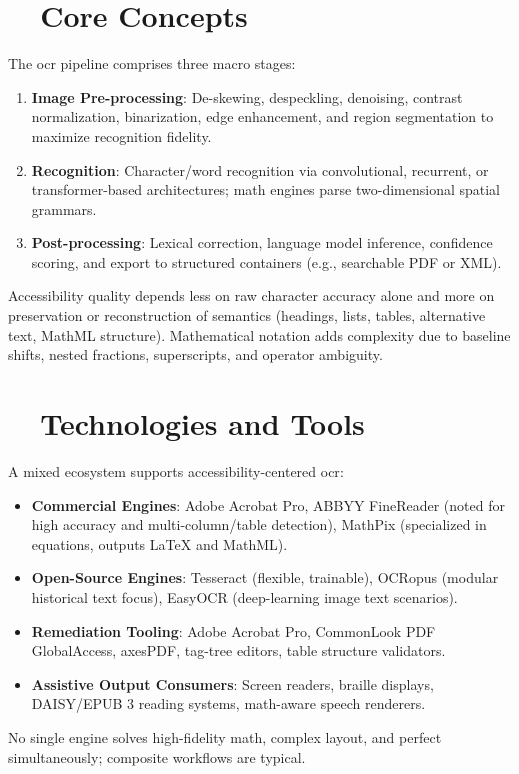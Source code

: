 \section{~~Core Concepts}
\label{sec:ocr-core-concepts}
The \gls{ocr} pipeline comprises three macro stages:
\begin{enumerate}
	\item \textbf{Image Pre-processing}: De-skewing, despeckling, denoising, contrast normalization, binarization, edge enhancement, and region segmentation to maximize recognition fidelity.
	\item \textbf{Recognition}: Character/word recognition via convolutional, recurrent, or transformer-based architectures; math engines parse two-dimensional spatial grammars.
	\item \textbf{Post-processing}: Lexical correction, language model inference, confidence scoring, and export to structured containers (e.g., searchable PDF or XML).
\end{enumerate}
Accessibility quality depends less on raw character accuracy alone and more on preservation or reconstruction of semantics (headings, lists, tables, alternative text, MathML structure). Mathematical notation adds complexity due to baseline shifts, nested fractions, superscripts, and operator ambiguity.

\section{~~Technologies and Tools}
\label{sec:ocr-tools}
A mixed ecosystem supports accessibility-centered \gls{ocr}:
\begin{itemize}
	\item \textbf{Commercial Engines}: Adobe Acrobat Pro, ABBYY FineReader (noted for high accuracy and multi-column/table detection), MathPix (specialized in equations, outputs LaTeX and MathML).
	\item \textbf{Open-Source Engines}: Tesseract (flexible, trainable), OCRopus (modular historical text focus), EasyOCR (deep-learning image text scenarios).
	\item \textbf{Remediation Tooling}: Adobe Acrobat Pro, CommonLook PDF GlobalAccess\supercite{AllyantCommonLook}, axesPDF, tag-tree editors, table structure validators.
	\item \textbf{Assistive Output Consumers}: Screen readers, braille displays, DAISY/EPUB 3 reading systems, math-aware speech renderers.
\end{itemize}
No single engine solves high-fidelity math, complex layout, and perfect  simultaneously; composite workflows are typical.

